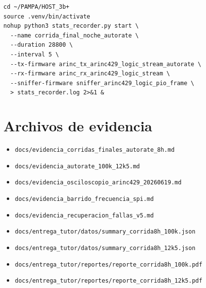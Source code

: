 \documentclass[12pt,a4paper,oneside]{report}
\begin{document}
\begin{lstlisting}
cd ~/PAMPA/HOST_3b+
source .venv/bin/activate
nohup python3 stats_recorder.py start \
  --name corrida_final_noche_autorate \
  --duration 28800 \
  --interval 5 \
  --tx-firmware arinc_tx_arinc429_logic_stream_autorate \
  --rx-firmware arinc_rx_arinc429_logic_stream \
  --sniffer-firmware sniffer_arinc429_logic_pio_frame \
  > stats_recorder.log 2>&1 &
\end{lstlisting}

\chapter{Archivos de evidencia}

\begin{itemize}
  \item \texttt{docs/evidencia\_corridas\_finales\_autorate\_8h.md}
  \item \texttt{docs/evidencia\_autorate\_100k\_12k5.md}
  \item \texttt{docs/evidencia\_osciloscopio\_arinc429\_20260619.md}
  \item \texttt{docs/evidencia\_barrido\_frecuencia\_spi.md}
  \item \texttt{docs/evidencia\_recuperacion\_fallas\_v5.md}
  \item \texttt{docs/entrega\_tutor/datos/summary\_corrida8h\_100k.json}
  \item \texttt{docs/entrega\_tutor/datos/summary\_corrida8h\_12k5.json}
  \item \texttt{docs/entrega\_tutor/reportes/reporte\_corrida8h\_100k.pdf}
  \item \texttt{docs/entrega\_tutor/reportes/reporte\_corrida8h\_12k5.pdf}
\end{itemize}
\end{document}
